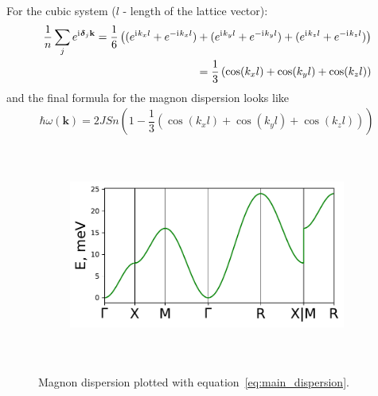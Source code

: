 \documentclass[a4paper,12pt]{article}
\newcommand{\iu}{\mathrm{i}\mkern1mu}
\begin{document}
For the cubic system ($l$ - length of the lattice vector):
\begin{align}
    \dfrac{1}{n}\sum_j
    e^{\iu\boldsymbol{\delta}_j\mathbf{k}}  = \dfrac{1}{6}\left((e^{\iu k_x l} + e^{-\iu k_x l}) + 
    (e^{\iu k_y l} + e^{-\iu k_y l}) +
    (e^{\iu k_z l} + e^{-\iu k_z l})\right) \\
    = \dfrac{1}{3}\left(\cos(k_x l) + \cos(k_y l) + \cos(k_z l)\right)
\end{align}
and the final formula for the magnon dispersion looks like
\begin{align}
    \boxed{
    \hbar\omega(\mathbf{k}) = 2JSn\left(1 - 
    \dfrac{1}{3}\left(\cos(k_x l) + \cos(k_y l) + \cos(k_z l)\right)\right)}
    \label{eq:main_dispersion}
\end{align}

\begin{figure}[H]
	\centering
	\begin{subfigure}[b]{0.8\textwidth}
		\centering
		\includegraphics[height=7cm]{main_dispersion.pdf}
	\end{subfigure}
	\hfill
	\caption{Magnon dispersion plotted with equation~\eqref{eq:main_dispersion}.}
	\label{fig:main_dispersion}
\end{figure}




\newpage
 
 
\end{document}
